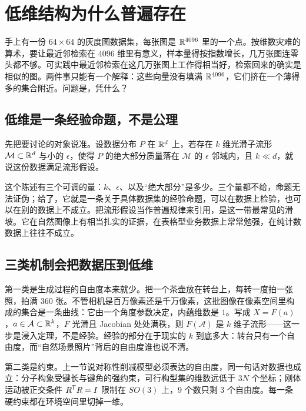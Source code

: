 \section{低维结构为什么普遍存在}
\label{sec:12-Real-Analysis-Support/10-Essential-Structures/02}

手上有一份 \(64\times 64\) 的灰度图数据集，每张图是 \(\mathbb{R}^{4096}\) 里的一个点。按维数灾难的算术，要让最近邻检索在 \(4096\) 维里有意义，样本量得按指数增长，几万张图连零头都不够。可实践中最近邻检索在这几万张图上工作得相当好，检索回来的确实是相似的图。两件事只能有一个解释：这些向量没有填满 \(\mathbb{R}^{4096}\)，它们挤在一个薄得多的集合附近。问题是，凭什么？

\subsection{低维是一条经验命题，不是公理}

先把要讨论的对象说准。设数据分布 \(P\) 在 \(\mathbb{R}^d\) 上，若存在 \(k\) 维光滑子流形 \(\mathcal M\subset\mathbb{R}^d\) 与小的 \(\epsilon\)，使得 \(P\) 的绝大部分质量落在 \(\mathcal M\) 的 \(\epsilon\) 邻域内，且 \(k\ll d\)，就说这份数据满足流形假设。

这个陈述有三个可调的量：\(k\)、\(\epsilon\)、以及``绝大部分''是多少。三个量都不给，命题无法证伪；给了，它就是一条关于具体数据集的经验命题，可以在数据上检验，也可以在别的数据上不成立。把流形假设当作普遍规律来引用，是这一带最常见的滑坡。它在自然图像上有相当扎实的证据，在表格型业务数据上常常勉强，在纯计数数据上往往不成立。

\subsection{三类机制会把数据压到低维}

第一类是生成过程的自由度本来就少。把一个茶壶放在转台上，每转一度拍一张照，拍满 \(360\) 张。不管相机是百万像素还是千万像素，这批图像在像素空间里构成的集合是一条曲线：它由一个角度参数决定，内蕴维数是 \(1\)。写成 \(X=F(a)\)，\(a\in\mathcal A\subset\mathbb{R}^k\)，\(F\) 光滑且 Jacobian 处处满秩，则 \(F(\mathcal A)\) 是 \(k\) 维子流形——这一步是浸入定理，不是经验。经验的部分在于现实的 \(k\) 到底多大：转台只有一个自由度，而``自然场景照片''背后的自由度谁也说不清。

第二类是约束。上一节说对称性削减模型必须表达的自由度，同一句话对数据也成立：分子构象受键长与键角的强约束，可行构型集的维数远低于 \(3N\) 个坐标；刚体运动被正交条件 \(R^{\mathsf{T}}R=I\) 限制在 \(SO(3)\) 上，\(9\) 个数只剩 \(3\) 个自由度。每一条硬约束都在环境空间里切掉一维。

